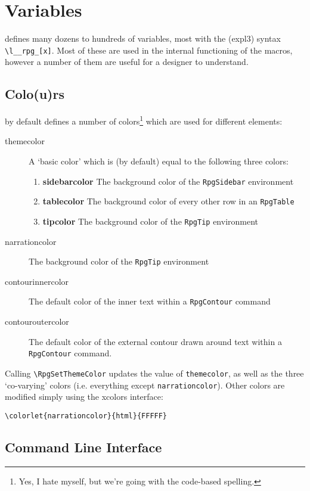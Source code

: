 \chapter{Variables}

	\rpgtex{} defines many dozens to hundreds of variables, most with the (expl3) syntax \verb|\l__rpg_[x]|. Most of these are used in the internal functioning of the macros, however a number of them are useful for a designer to understand.

	\section{Colo(u)rs}\label{S:Colors}

		\rpgtex{} by default defines a number of colors\footnote{Yes, I hate myself, but we're going with the code-based spelling.} which are used for different elements:
		\begin{description}
			\item[themecolor] A `basic color' which is (by default) equal to the following three colors:
			\begin{enumerate}
				\item \textbf{sidebarcolor} The background color of the \verb|RpgSidebar| environment
				\item \textbf{tablecolor} The background color of every other row in an \verb|RpgTable| 
				\item \textbf{tipcolor} The background color of the \verb|RpgTip| environment 
			\end{enumerate} 
			\item[narrationcolor]  The background color of the \verb|RpgTip| environment 
			\item[contourinnercolor]  The default color of the inner text within a \verb|RpgContour| command 
			\item[contouroutercolor]  The default color of the external contour drawn around text within a \verb|RpgContour| command.
		\end{description}

		Calling \verb|\RpgSetThemeColor|  updates the value of \verb|themecolor|, as well as the three `co-varying' colors (i.e. everything except \verb|narrationcolor|). Other colors are modified simply using the xcolors interface:

		\verb|\colorlet{narrationcolor}{html}{FFFFF}|



	\section{Command Line Interface}\label{S:CMD}

